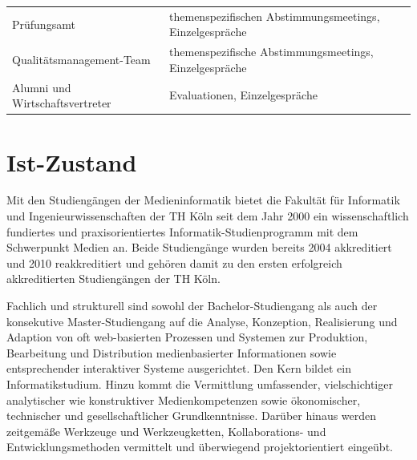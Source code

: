 \begin{longtable}[]{@{}ll@{}}
\begin{minipage}[t]{0.5\columnwidth}
Prüfungsamt\strut
\end{minipage} & \begin{minipage}[t]{0.5\columnwidth}\raggedright\strut
themenspezifischen Abstimmungsmeetings, Einzelgespräche\strut
\end{minipage}\tabularnewline
\begin{minipage}[t]{0.5\columnwidth}\raggedright\strut
Qualitätsmanagement-Team\strut
\end{minipage} & \begin{minipage}[t]{0.5\columnwidth}\raggedright\strut
themenspezifische Abstimmungsmeetings, Einzelgespräche\strut
\end{minipage}\tabularnewline
\begin{minipage}[t]{0.5\columnwidth}\raggedright\strut
Alumni und Wirtschaftsvertreter\strut
\end{minipage} & \begin{minipage}[t]{0.5\columnwidth}\raggedright\strut
Evaluationen, Einzelgespräche\strut
\end{minipage}\tabularnewline
\bottomrule
\end{longtable}

\chapter{Ist-Zustand}\label{ist-zustand}

Mit den Studiengängen der Medieninformatik bietet die Fakultät für
Informatik und Ingenieurwissenschaften der TH Köln seit dem Jahr 2000
ein wissenschaftlich fundiertes und praxisorientiertes
Informatik-Studienprogramm mit dem Schwerpunkt Medien an. Beide
Studiengänge wurden bereits 2004 akkreditiert und 2010 reakkreditiert
und gehören damit zu den ersten erfolgreich akkreditierten Studiengängen
der TH Köln.

Fachlich und strukturell sind sowohl der Bachelor-Studiengang als auch
der konsekutive Master-Studiengang auf die Analyse, Konzeption,
Realisierung und Adaption von oft web-basierten Prozessen und Systemen
zur Produktion, Bearbeitung und Distribution medienbasierter
Informationen sowie entsprechender interaktiver Systeme ausgerichtet.
Den Kern bildet ein Informatikstudium. Hinzu kommt die Vermittlung
umfassender, vielschichtiger analytischer wie konstruktiver
Medienkompetenzen sowie ökonomischer, technischer und gesellschaftlicher
Grundkenntnisse. Darüber hinaus werden zeitgemäße Werkzeuge und
Werkzeugketten, Kollaborations- und Entwicklungsmethoden vermittelt und
überwiegend projektorientiert eingeübt.

